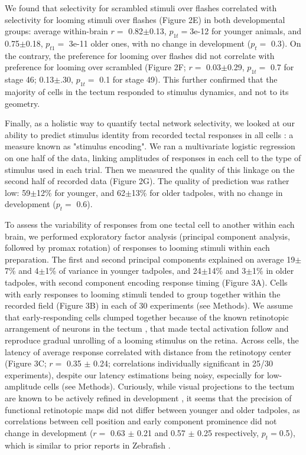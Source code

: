 \documentclass{article}
\begin{document}
We found that selectivity for scrambled stimuli over flashes correlated with selectivity for looming stimuli over flashes (Figure 2E) in both developmental groups: average within-brain $r=$ 0.82$\pm$0.13, $p_{1t}=$3e-12 for younger animals, and 0.75$\pm$0.18, $p_{t1}=$ 3e-11 older ones, with no change in development ($p_t=$ 0.3). On the contrary, the preference for looming over flashes did not correlate with preference for looming over scrambled (Figure 2F; $r=$ 0.03$\pm$0.29, $p_{1t}=$ 0.7 for stage 46; 0.13$\pm$.30, $p_{1t}=$ 0.1 for stage 49). This further confirmed that the majority of cells in the tectum responded to stimulus dynamics, and not to its geometry.

Finally, as a holistic way to quantify tectal network selectivity, we looked at our ability to predict stimulus identity from recorded tectal responses in all cells \citep{avitan2016limitations}: a measure known as "stimulus encoding". We ran a multivariate logistic regression on one half of the data, linking amplitudes of responses in each cell to the type of stimulus used in each trial. Then we measured the quality of this linkage on the second half of recorded data (Figure 2G). The quality of prediction was rather low: 59$\pm$12\% for younger, and 62$\pm$13\% for older tadpoles, with no change in development ($p_t=$ 0.6).


To assess the variability of responses from one tectal cell to another within each brain, we performed exploratory factor analysis (principal component analysis, followed by promax rotation) of responses to looming stimuli within each preparation. The first and second principal components explained on average 19$\pm$7\% and 4$\pm$1\% of variance in younger tadpoles, and 24$\pm$14\% and 3$\pm$1\% in older tadpoles, with second component encoding response timing (Figure 3A). Cells with early responses to looming stimuli tended to group together within the recorded field (Figure 3B) in each of 30 experiments (see Methods). We assume that early-responding cells clumped together because of the known retinotopic arrangement of neurons in the tectum \citep{ruthazer2004map}, that made tectal activation follow and reproduce gradual unrolling of a looming stimulus on the retina. Across cells, the latency of average response correlated with distance from the retinotopy center (Figure 3C; $r=$ 0.35 $\pm$ 0.24; correlations individually significant in 25/30 experiments), despite our latency estimations being noisy, especially for low-amplitude cells (see Methods). Curiously, while visual projections to the tectum are known to be actively refined in development \citep{sakaguchi1985refinement, ruthazer2004map, munz2014hebbian}, it seems that the precision of functional retinotopic maps did not differ between younger and older tadpoles, as correlations between cell position and early component prominence did not change in development ($r=$ 0.63 $\pm$ 0.21 and 0.57 $\pm$ 0.25 respectively, $p_t= $0.5), which is similar to prior reports in Zebrafish \citep{avitan2016limitations}.
\end{document}
